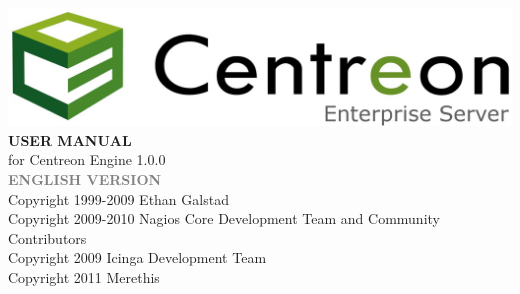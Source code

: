 \documentclass[a4paper]{book}
\begin{document}
\begin{titlepage}
\vspace*{1.5cm}
\begin{center}
\mbox{\includegraphics{centreon_logo}}
\vspace*{2cm}
{\fontsize{16}{16} \bf USER MANUAL }\\
{\large for Centreon Engine 1.0.0 }\\
\vspace*{0.5cm}
{\textcolor{gray}{\large \bf ENGLISH VERSION }}\\
\vspace*{6cm}
{\small \hfill Copyright 1999-2009 Ethan Galstad\\\hfill Copyright 2009-2010 Nagios Core Development Team and Community Contributors\\\hfill Copyright 2009 Icinga Development Team\\\hfill Copyright 2011 Merethis}\\
\end{center}
\end{titlepage}
\clearemptydoublepage
{}
\tableofcontents
\clearemptydoublepage
{}
\end{document}

